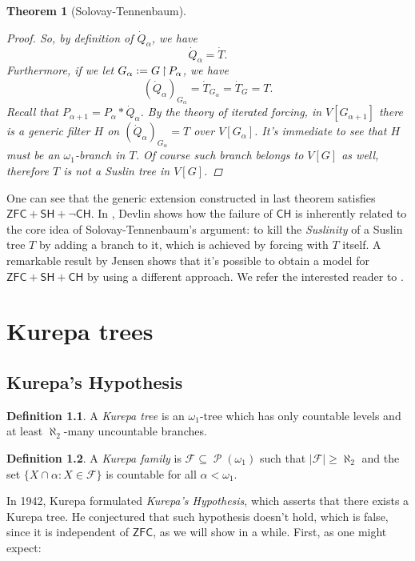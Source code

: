 \documentclass[11pt,a4paper]{report}
\newtheorem{theorem}{Theorem}[chapter] %
\theoremstyle{definition}
\newtheorem{defn}[theorem]{Definition}
\theoremstyle{num.custom-title}
\theoremstyle{custom-title}
\DeclareMathOperator{\PP}{\mathcal{P}}
\DeclareMathOperator{\sse}{\subseteq}
\DeclareMathOperator{\restr}{\upharpoonright}
\newcommand{\ZFC}{\ensuremath{\mathsf{ZFC}}\xspace}
\newcommand{\CH}{\ensuremath{\mathsf{CH}}\xspace}
\newcommand{\SH}{\ensuremath{\mathsf{SH}}\xspace}
\newcommand{\F}{\mathcal{F}}
\newcommand*{\defeq}{\mathrel{\rlap{%
                     \raisebox{0.3ex}{$\cdot$}}%
                     \raisebox{-0.3ex}{$\cdot$}}%
                     =}
\begin{document}
\begin{theorem}[Solovay-Tennenbaum]
\begin{proof}
So, by definition of $\dot{Q}_\alpha$, we have
\[
\dot{Q}_\alpha = \dot{T}.
\]
Furthermore, if we let $G_\alpha \defeq G \restr P_\alpha$, we have
\[
(\dot{Q}_\alpha)_{G_\alpha} = \dot{T}_{G_\alpha} = \dot{T}_G = T.
\]
Recall that $P_{\alpha+1} = P_\alpha * \dot{Q}_\alpha$. By the theory of iterated forcing, in $V[G_{\alpha+1}]$ there is a generic filter $H$ on $(\dot{Q}_\alpha)_{G_\alpha} = T$ over $V[G_\alpha]$. It's immediate to see that $H$ must be an $\omega_1$-branch in $T$. Of course such branch belongs to $V[G]$ as well, therefore $T$ is not a Suslin tree in $V[G]$.
\end{proof}
\end{theorem}

One can see that the generic extension constructed in last theorem satisfies $\ZFC + \SH + \neg\CH$. In \cite{Dev1974}, Devlin shows how the failure of \CH is inherently related to the core idea of Solovay-Tennenbaum's argument: to kill the \emph{Suslinity} of a Suslin tree $T$ by adding a branch to it, which is achieved by forcing with $T$ itself. A remarkable result by Jensen shows that it's possible to obtain a model for $\ZFC + \SH + \CH$ by using a different approach. We refer the interested reader to \cite{Dev1974}.



\chapter{Kurepa trees}

\section{Kurepa's Hypothesis}

\begin{defn}
A \emph{Kurepa tree} is an $\omega_1$-tree which has only countable levels and at least $\aleph_2$-many uncountable branches.
\end{defn}

\begin{defn}
A \emph{Kurepa family} is $\F \sse \PP(\omega_1)$ such that $|\F| \geq \aleph_2$ and the set $\{X \cap \alpha : X \in \F\}$ is countable for all $\alpha < \omega_1$.
\end{defn}

In 1942, Kurepa formulated \emph{Kurepa's Hypothesis}, which asserts that there exists a Kurepa tree. He conjectured that such hypothesis doesn't hold, which is false, since it is independent of \ZFC, as we will show in a while. First, as one might expect:
\end{document}
